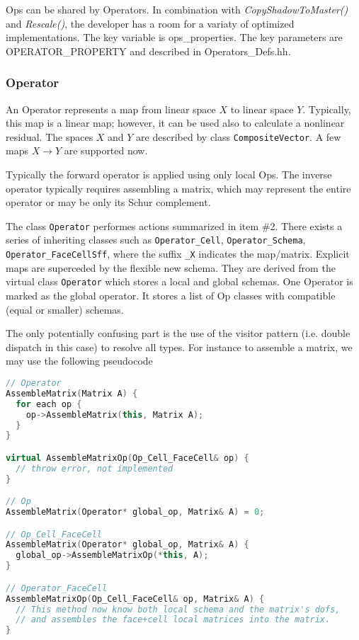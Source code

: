 Ops can be shared by Operators. 
In combination with {\it CopyShadowToMaster()} and {\it Rescale()},
the developer has a room for a variaty of optimized implementations.
The key variable is ops\_properties. The key parameters are 
OPERATOR\_PROPERTY and described in Operators\_Defs.hh.


\subsubsection{Operator}
An Operator represents a map from linear space $X$ to linear space $Y$.
Typically, this map is a linear map; however, it can be used also to calculate
a nonlinear residual. 
The spaces $X$ and $Y$ are described by class {\tt CompositeVector}. 
A few maps $X \to Y$ are supported now.

Typically the forward operator is applied using only local Ops.
The inverse operator typically requires assembling a matrix, which 
may represent the entire operator or may be only its Schur complement.

The class {\tt Operator} performes actions summarized in item \#2. There exists
a series of inheriting classes such as {\tt Operator\_Cell}, {\tt Operator\_Schema}, 
{\tt Operator\_FaceCellSff}, where the suffix {\tt \_X} indicates the map/matrix.
Explicit maps are superceded by the flexible new schema.
They are derived from the virtual class {\tt Operator} which stores a local 
and global schemas. 
One Operator is marked as the global operator. It stores a list of Op classes
with compatible (equal or smaller) schemas.

The only potentially confusing part is the use of the visitor pattern (i.e. double 
dispatch in this case) to resolve all types.  
For instance to assemble a matrix, we may use the following pseudocode

\begin{lstlisting}[language=C++]
// Operator
AssembleMatrix(Matrix A) {
  for each op {
    op->AssembleMatrix(this, Matrix A);
  }
}

virtual AssembleMatrixOp(Op_Cell_FaceCell& op) { 
  // throw error, not implemented
}

// Op
AssembleMatrix(Operator* global_op, Matrix& A) = 0;

// Op_Cell_FaceCell
AssembleMatrix(Operator* global_op, Matrix& A) {
  global_op->AssembleMatrixOp(*this, A);
}

// Operator_FaceCell
AssembleMatrixOp(Op_Cell_FaceCell& op, Matrix& A) {
  // This method now know both local schema and the matrix's dofs, 
  // and assembles the face+cell local matrices into the matrix.
}
\end{lstlisting}

